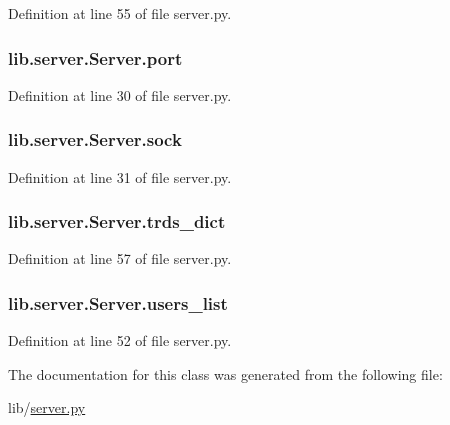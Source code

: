 Definition at line 55 of file server.\+py.

\subsubsection[{\texorpdfstring{port}{port}}]{\setlength{\rightskip}{0pt plus 5cm}lib.\+server.\+Server.\+port}\hypertarget{classlib_1_1server_1_1_server_a2d6cee10cfeca5b851e1f7e9276c9be7}{}\label{classlib_1_1server_1_1_server_a2d6cee10cfeca5b851e1f7e9276c9be7}


Definition at line 30 of file server.\+py.

\subsubsection[{\texorpdfstring{sock}{sock}}]{\setlength{\rightskip}{0pt plus 5cm}lib.\+server.\+Server.\+sock}\hypertarget{classlib_1_1server_1_1_server_a9b368c1b53b943b0170ec7ca5d216af0}{}\label{classlib_1_1server_1_1_server_a9b368c1b53b943b0170ec7ca5d216af0}


Definition at line 31 of file server.\+py.

\subsubsection[{\texorpdfstring{trds\+\_\+dict}{trds_dict}}]{\setlength{\rightskip}{0pt plus 5cm}lib.\+server.\+Server.\+trds\+\_\+dict}\hypertarget{classlib_1_1server_1_1_server_a630c17611509ad5aafc7d6a9390ee225}{}\label{classlib_1_1server_1_1_server_a630c17611509ad5aafc7d6a9390ee225}


Definition at line 57 of file server.\+py.

\subsubsection[{\texorpdfstring{users\+\_\+list}{users_list}}]{\setlength{\rightskip}{0pt plus 5cm}lib.\+server.\+Server.\+users\+\_\+list}\hypertarget{classlib_1_1server_1_1_server_afd8269952d012312cd598da1ede38dce}{}\label{classlib_1_1server_1_1_server_afd8269952d012312cd598da1ede38dce}


Definition at line 52 of file server.\+py.



The documentation for this class was generated from the following file\+:\begin{DoxyCompactItemize}
\item 
lib/\hyperlink{server_8py}{server.\+py}\end{DoxyCompactItemize}
